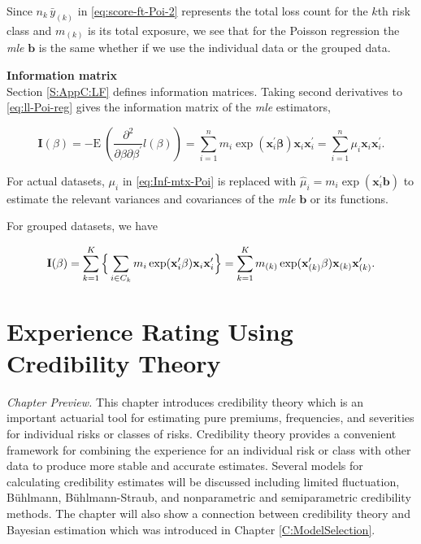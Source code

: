 \documentclass[]{book}
\theoremstyle{definition}
\theoremstyle{definition}
\theoremstyle{definition}
\theoremstyle{remark}
\begin{document}
Since \(n_k\, \bar{y}_{(k)}\) in \eqref{eq:score-ft-Poi-2} represents the
total loss count for the \(k\)th risk class and \(m_{(k)}\) is its total
exposure, we see that for the Poisson regression the \emph{mle}
\(\mathbf{ b}\) is the same whether if we use the individual data or the
grouped data.

\textbf{Information matrix}\\
Section \ref{S:AppC:LF} defines information matrices. Taking second
derivatives to \eqref{eq:ll-Poi-reg} gives the information matrix of the
\emph{mle} estimators,

\begin{equation}
\mathbf{ I}(\beta)=-\mathrm{E~}{\left( \frac{\partial^2}{\partial \beta\partial \beta^{\prime}}l(\beta) \right)}=\sum^n_{i=1}m_i \exp(\mathbf{ x}^{\prime}_i \mathbf{ \beta})\mathbf{ x}_i \mathbf{ x}_i^{\prime}=\sum^n_{i=1} {\mu}_i \mathbf{ x}_i \mathbf{ x}_i^{\prime}.
\label{eq:Inf-mtx-Poi}
\end{equation}

For actual datasets, \({\mu}_i\) in \eqref{eq:Inf-mtx-Poi} is replaced
with \(\hat{\mu}_i=m_i \exp(\mathbf{ x}^{\prime}_i \mathbf{ b})\) to
estimate the relevant variances and covariances of the \emph{mle}
\(\mathbf{ b}\) or its functions.

For grouped datasets, we have

\begin{equation}
\mathbf{ I}(\beta)=\sum^K_{k=1} \Big{\{}\sum_{i \in C_k}m_i \exp(\mathbf{ x}^{\prime}_i \mathbf{ \beta})\mathbf{ x}_i \mathbf{ x}_i^{\prime} \Big{\}}=\sum^K_{k=1} m_{(k)} \exp(\mathbf{ x}^{\prime}_{(k)} \mathbf{ \beta})\mathbf{ x}_{(k)} \mathbf{ x}_{(k)}^{\prime}.
\end{equation}

\chapter{Experience Rating Using Credibility
Theory}\label{C:Credibility}

\emph{Chapter Preview.} This chapter introduces credibility theory which
is an important actuarial tool for estimating pure premiums,
frequencies, and severities for individual risks or classes of risks.
Credibility theory provides a convenient framework for combining the
experience for an individual risk or class with other data to produce
more stable and accurate estimates. Several models for calculating
credibility estimates will be discussed including limited fluctuation,
Bühlmann, Bühlmann-Straub, and nonparametric and semiparametric
credibility methods. The chapter will also show a connection between
credibility theory and Bayesian estimation which was introduced in
Chapter \ref{C:ModelSelection}.
\end{document}
